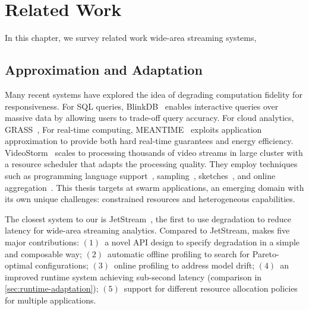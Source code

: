 \documentclass[thesis.tex]{subfiles}
\begin{document}
\chapter{Related Work}
\label{cha:related-work}

In this chapter, we survey related work wide-area streaming systems,

\section{Approximation and Adaptation}
\label{sec:appr-adapt}

Many recent systems have explored the idea of degrading computation fidelity for
responsiveness.  For SQL queries, BlinkDB~\cite{agarwal2013blinkdb} enables
interactive queries over massive data by allowing users to trade-off query
accuracy. For cloud analytics, GRASS~\cite{ananthanarayanan2014grass}, For
real-time computing, MEANTIME~\cite{farrell2016meantime} exploits application
approximation to provide both hard real-time guarantees and energy
efficiency. VideoStorm~\cite{zhang2017live} scales to processing thousands of
video streams in large cluster with a resource scheduler that adapts the
processing quality. They employ techniques such as programming language
support~\cite{sampson2011enerj}, sampling~\cite{garofalakis2001approximate},
sketches~\cite{cormode2011sketch}, and online
aggregation~\cite{hellerstein1997online}. This thesis targets at swarm
applications, an emerging domain with its own unique challenges: constrained
resources and heterogeneous capabilities.

The closest system to our \awstream{} is JetStream~\cite{rabkin2014aggregation},
the first to use degradation to reduce latency for wide-area streaming
analytics. Compared to JetStream, \sysname{} makes five major contributions:
$(1)$~a novel API design to specify degradation in a simple and composable way;
$(2)$~automatic offline profiling to search for Pareto-optimal configurations;
$(3)$~online profiling to address model drift; $(4)$~an improved runtime system
achieving sub-second latency (comparison in \autoref{sec:runtime-adaptation});
$(5)$~support for different resource allocation policies for multiple
applications.
\end{document}
